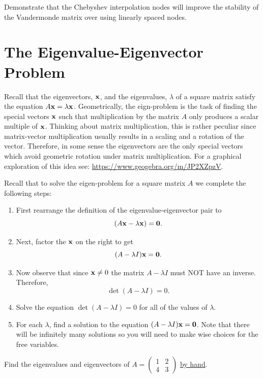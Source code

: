 \begin{problem}
    Demonstrate that the Chebyshev interpolation nodes will improve the stability of the
    Vandermonde matrix over using linearly spaced nodes.
\end{problem}


\newpage\section{The Eigenvalue-Eigenvector Problem}
Recall that the eigenvectors, ${\bf x}$, and the eigenvalues, $\lambda$ of a square matrix satisfy the
equation $A{\bf x}=\lambda {\bf x}$. Geometrically, the eign-problem is the task of finding the special
vectors ${\bf x}$ such that multiplication by the matrix $A$ only produces a scalar multiple of
${\bf x}$. Thinking about matrix multiplication, this is rather peculiar since matrix-vector
multiplication usually results in a scaling and a rotation of the vector. Therefore, in
some sense the eigenvectors are the only special vectors which avoid geometric rotation
under matrix multiplication.  For a graphical exploration of this idea see:
\href{https://www.geogebra.org/m/JP2XZpzV}{https://www.geogebra.org/m/JP2XZpzV}.

Recall that to solve the eigen-problem for a square matrix $A$ we complete the following
steps:
\begin{enumerate}
    \item First rearrange the definition of the eigenvalue-eigenvector pair to 
        \[ (A{\bf x}-\lambda {\bf x})={\bf 0}. \]
    \item Next, factor the ${\bf x}$ on the right to get 
        \[ (A-\lambda I) {\bf x}={\bf 0}. \]
    \item Now observe that since ${\bf x} \ne 0$ the matrix $A-\lambda I$ must NOT have an inverse. Therefore,
        \[ \det(A-\lambda I)=0. \]
    \item Solve the equation $\det(A-\lambda I)=0$ for all of the values of $\lambda$.
    \item For each $\lambda$, find a solution to the equation $(A-\lambda I) {\bf x}={\bf 0}$.
        Note that there will be infinitely many solutions so you will need to make wise
        choices for the free variables.
\end{enumerate}
\begin{problem}
    Find the eigenvalues and eigenvectors of $A = \begin{pmatrix} 1 & 2 \\ 4 & 3
    \end{pmatrix}$ \underline{by hand}.
\end{problem}


